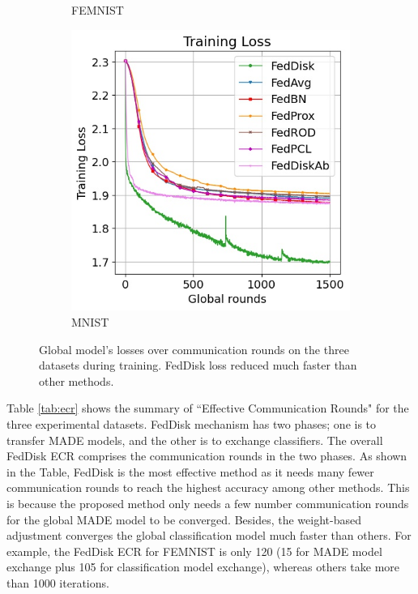 \documentclass[journal]{IEEEtai}
\newcommand{\MethodnameShort}{FedDisk}
\begin{document}
\begin{figure}[h!]
\begin{subfigure}{0.3\linewidth}
		\caption{FEMNIST}
	\end{subfigure}
	\hspace{0.01em}%
	\begin{subfigure}{0.3\linewidth}	
		\includegraphics[width=\linewidth]{Figures/mnist/train_loss}
		\caption{MNIST  }
	\end{subfigure}
	\caption{Global model's losses over communication rounds on the three datasets during training. FedDisk loss reduced much faster than other methods. }
	\label{fig:loss_all}
\end{figure}


Table \ref{tab:ecr} shows the summary of ``Effective Communication Rounds" for the three experimental datasets. \MethodnameShort{} mechanism has two phases; one is to transfer MADE models, and the other is to exchange classifiers. The overall \MethodnameShort{} ECR comprises the communication rounds in the two phases. As shown in the Table, \MethodnameShort{} is the most effective method as it needs many fewer communication rounds to reach the highest accuracy among other methods. This is because the proposed method only needs a few number communication rounds for the global MADE model to be converged. Besides, the weight-based adjustment converges the global classification model much faster than others. For example, the \MethodnameShort{} ECR for FEMNIST is only 120 (15 for MADE model exchange plus 105 for classification model exchange), whereas others take more than 1000 iterations.
\end{document}
